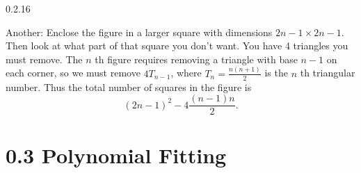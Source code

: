 \documentclass[11pt,]{book}
\theoremstyle{ptxplainnotitle}
\theoremstyle{ptxplaintitle}
\theoremstyle{ptxdefinitionnotitle}
\theoremstyle{ptxdefinitiontitle}
\theoremstyle{ptxdefinitionnotitle}
\theoremstyle{ptxdefinitiontitle}
\theoremstyle{ptxdefinitionnotitle}
\theoremstyle{ptxdefinitiontitle}
\theoremstyle{ptxdefinitiontitlenonumber}
\theoremstyle{ptxdefinitiontitlenonumber}
\numberwithin{equation}{chapter}
\begin{document}
\begin{divisionexercise}{0.2.16}
\begin{enumerate}[label=(\alph*)]
\par
\hypertarget{p-359}{}%
Another: Enclose the figure in a larger square with dimensions \(2n-1 \times 2n-1\).  Then look at what part of that square you don't want.  You have 4 triangles you must remove.  The \(n\) th figure requires removing a triangle with base \(n-1\) on each corner, so we must remove \(4T_{n-1}\), where \(T_n = \frac{n(n+1)}{2}\) is the \(n\) th triangular number.  Thus the total number of squares in the figure is%
\begin{equation*}
(2n-1)^2 - 4\frac{(n-1)n}{2}.
\end{equation*}
%
\end{enumerate}
%
\end{divisionexercise}%
\section*{0.3 Polynomial Fitting}
\end{document}
